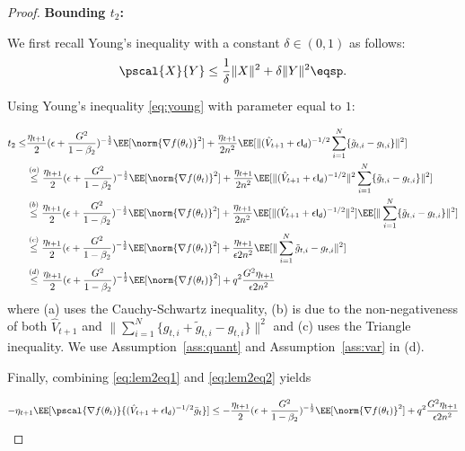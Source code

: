 \documentclass[11pt]{article}
\begin{document}
\begin{proof}
\textbf{Bounding $t_2$:}

We first recall Young's inequality with a constant $\delta \in (0,1)$ as follows:
\begin{equation}\label{eq:young}
\pscal{X}{Y} \leq \frac{1}{\delta} \|X\|^2 + \delta \|Y\|^2 \eqsp.
\end{equation}

Using Young's inequality \eqref{eq:young} with parameter equal to $1$:

\begin{equation}\label{eq:lem2eq2}
\begin{split}
t_2 \leq &  \frac{\eta_{t+1}}{2} (\epsilon + \frac{G^2}{1 - \beta_2})^{-\frac{1}{2}} \EE[\norm{\nabla f(\theta_t)}^2] +\frac{\eta_{t+1}}{2n^2} \EE[\|(\hat{V}_{t+1} + \epsilon \mathsf{I_d})^{-1/2} \sum_{i=1}^N  \{ \tilde g_{t,i} - g_{t,i} \} \|^2]\\
& \overset{(a)}{\leq} \frac{\eta_{t+1}}{2} (\epsilon + \frac{G^2}{1 - \beta_2})^{-\frac{1}{2}} \EE[\norm{\nabla f(\theta_t)}^2] +\frac{\eta_{t+1}}{2n^2} \EE[\|(\hat{V}_{t+1} + \epsilon \mathsf{I_d})^{-1/2} \|^2 \sum_{i=1}^N  \{\tilde g_{t,i} - g_{t,i} \} \|^2]\\
& \overset{(b)}{\leq} \frac{\eta_{t+1}}{2} (\epsilon + \frac{G^2}{1 - \beta_2})^{-\frac{1}{2}} \EE[\norm{\nabla f(\theta_t)}^2] +\frac{\eta_{t+1}}{2n^2} \EE[\|(\hat{V}_{t+1} + \epsilon \mathsf{I_d})^{-1/2} \|^2] \EE[\| \sum_{i=1}^N  \{\tilde g_{t,i} - g_{t,i} \} \|^2]\\
& \overset{(c)}{\leq} \frac{\eta_{t+1}}{2} (\epsilon + \frac{G^2}{1 - \beta_2})^{-\frac{1}{2}} \EE[\norm{\nabla f(\theta_t)}^2] +\frac{\eta_{t+1}}{\epsilon 2n^2}  \EE[\| \sum_{i=1}^N \tilde g_{t,i} - g_{t,i} \|^2]\\
& \overset{(d)}{\leq} \frac{\eta_{t+1}}{2}(\epsilon + \frac{G^2}{1 - \beta_2})^{-\frac{1}{2}} \EE[\norm{\nabla f(\theta_t)}^2] +q^2\frac{G^2 \eta_{t+1}}{\epsilon 2n^2}
\end{split}
\end{equation}
where (a) uses the Cauchy-Schwartz inequality, (b) is due to the non-negativeness of both $\hat{V}_{t+1}$ and $\| \sum_{i=1}^N  \{g_{t,i} + \tilde g_{t,i} - g_{t,i} \} \|^2$ and (c) uses the Triangle inequality.
We use Assumption~\ref{ass:quant} and Assumption~\ref{ass:var} in (d).

Finally, combining \eqref{eq:lem2eq1} and \eqref{eq:lem2eq2} yields

\begin{equation}
-\eta_{t+1}\EE[\pscal{\nabla f(\theta_t)}{(\hat{V}_{t+1} + \epsilon \mathsf{I_d})^{-1/2} \bar{g}_t}] \leq - \frac{\eta_{t+1}}{2}  (\epsilon + \frac{G^2}{1 - \beta_2})^{-\frac{1}{2}} \EE[\norm{\nabla f(\theta_t)}^2] +q^2 \frac{G^2 \eta_{t+1}}{\epsilon 2n^2}
\end{equation}


\end{proof}
\end{document}

